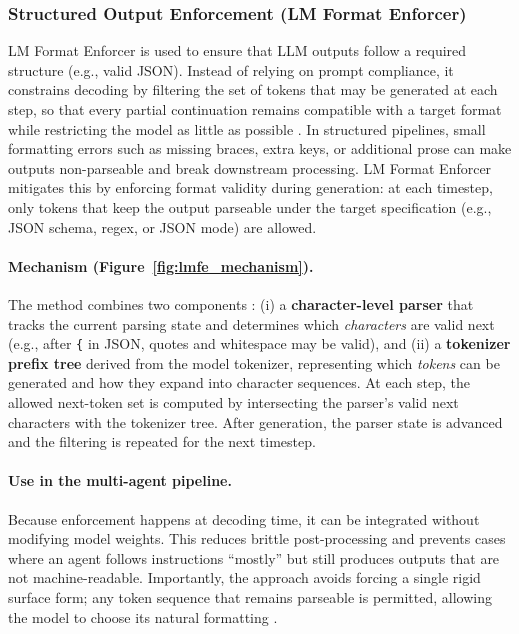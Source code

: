 \subsubsection{Structured Output Enforcement (LM Format Enforcer)}
\label{sec:lmfe}

LM Format Enforcer is used to ensure that LLM outputs follow a required structure (e.g., valid JSON).
Instead of relying on prompt compliance, it constrains decoding by filtering the set of tokens that may be generated at each step, so that every partial continuation remains compatible with a target format while restricting the model as little as possible \cite{noamgat-no-date}. In structured pipelines, small formatting errors such as missing braces, extra keys, or additional prose can make outputs non-parseable and break downstream processing. LM Format Enforcer mitigates this by enforcing format validity during generation: at each timestep, only tokens that keep the output parseable under the target specification (e.g., JSON schema, regex, or JSON mode) are allowed.

\paragraph{Mechanism (Figure~\ref{fig:lmfe_mechanism}).}
The method combines two components \cite{noamgat-no-date}:
(i) a \textbf{character-level parser} that tracks the current parsing state and determines which \emph{characters} are valid next (e.g., after \texttt{\{} in JSON, quotes and whitespace may be valid), and
(ii) a \textbf{tokenizer prefix tree} derived from the model tokenizer, representing which \emph{tokens} can be generated and how they expand into character sequences.
At each step, the allowed next-token set is computed by intersecting the parser’s valid next characters with the tokenizer tree.
After generation, the parser state is advanced and the filtering is repeated for the next timestep.

\paragraph{Use in the multi-agent pipeline.}
Because enforcement happens at decoding time, it can be integrated without modifying model weights.
This reduces brittle post-processing and prevents cases where an agent follows instructions “mostly” but still produces outputs that are not machine-readable.
Importantly, the approach avoids forcing a single rigid surface form; any token sequence that remains parseable is permitted, allowing the model to choose its natural formatting \cite{noamgat-no-date}.

